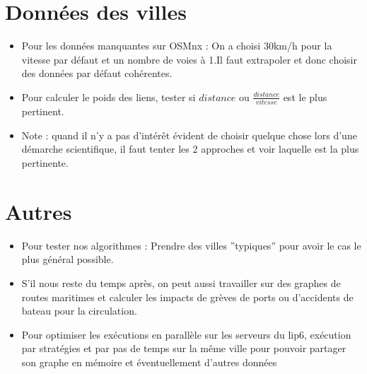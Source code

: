 \documentclass{article}
\begin{document}
\newpage
	
\section*{Données des villes}
	\begin{itemize}
		\item Pour les données manquantes sur OSMnx : On a choisi 30km/h pour la vitesse par défaut et un nombre de voies à 1.\newline Il faut extrapoler et donc choisir des données par défaut cohérentes.
		\item Pour calculer le poids des liens, tester si ${distance}$ ou ${\frac{distance}{vitesse}}$ est le plus pertinent.
		\item Note : quand il n’y a pas d’intérêt évident de choisir quelque chose lors d’une démarche scientifique, il faut tenter les 2 approches et voir laquelle est la plus pertinente.
	\end{itemize}
	
	\section*{Autres}
	\begin{itemize}
		\item  Pour tester nos algorithmes : Prendre des villes ”typiques” pour avoir le cas le plus général possible.
		\item S’il nous reste du temps après, on peut aussi travailler sur des graphes de routes maritimes et calculer les impacts de grèves de ports ou d’accidents de bateau pour la circulation.
		\item Pour optimiser les exécutions en parallèle sur les serveurs du lip6, exécution par stratégies et par pas de temps sur la même ville pour pouvoir partager son graphe en mémoire et éventuellement d’autres données
	\end{itemize}
	
\end{document}
